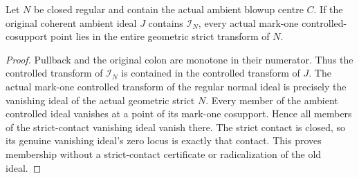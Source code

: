 \begin{lemma}
\label{hir:disjoint-actual-controlled-strict-contact}
\leanok
Let $N$ be closed regular and contain the actual ambient blowup centre $C$.
If the original coherent ambient ideal $J$ contains $\mathcal I_N$, every
actual mark-one controlled-cosupport point lies in the entire geometric
strict transform of $N$.
\end{lemma}
\begin{proof}
Pullback and the original colon are monotone in their numerator. Thus the
controlled transform of $\mathcal I_N$ is contained in the controlled transform
of $J$. The actual mark-one controlled transform of the regular normal ideal
is precisely the vanishing ideal of the actual geometric strict $N$.
Every member of the ambient controlled ideal vanishes at a point of its
mark-one cosupport. Hence all members of the strict-contact vanishing ideal
vanish there. The strict contact is closed, so its genuine vanishing ideal's
zero locus is exactly that contact. This proves membership without a
strict-contact certificate or radicalization of the old ideal.
\end{proof}

